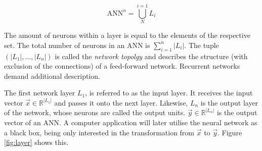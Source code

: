 \documentclass[10pt,a4paper,DIV=11]{scrreprt}
\begin{document}
\begin{equation}
    \text{ANN}^n = \bigcup_{N}^{i=1}{L_i}
\end{equation}

The amount of neurons within a layer is equal to the elements of the respective set. The total number of neurons in an ANN is 
$\sum_{i=1}^{n}{|L_i|}$. The tuple $(|L_1|,...,|L_n|)$ is called the \textit{network topolgy} and describes the 
structure (with exclusion of the connections) of a feed-forward network. Recurrent networks demand additional description.

The first network layer $L_1$, is referred to as the input layer. It receives the input vector $\overrightarrow{x} \in \mathds{R}^{|L_1|}$ and 
passes it onto the next layer. Likewise, $L_n$ is the output layer of the network, whose neurons are called the output units. 
$\overrightarrow{y} \in \mathds{R}^{|L_n|}$ is the output vector of an ANN. A computer application will later utilise the neural network as a black 
box, being only interested in the transformation from $\overrightarrow{x}$ to $\overrightarrow{y}$. Figure \ref{fig:layer} shows this. 
\end{document}

